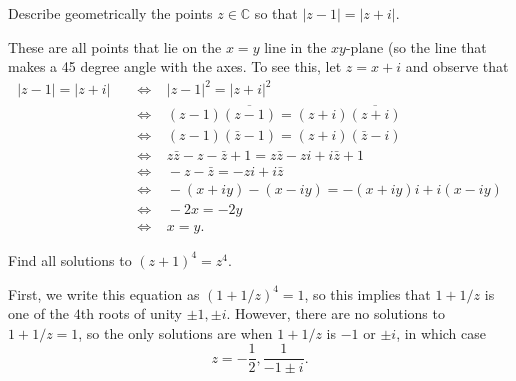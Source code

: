 \documentclass[11pt,dvipsnames]{book}
\numberwithin{figure}{section} %
\numberwithin{table}{section} %
\begin{document}
\begin{exercise} Describe geometrically the points $z\in\mathbb{C}$ so that $|z-1|=|z+i|$.

\begin{solution}
These are all points that lie on the $x=y$ line in the $xy$-plane (so the line that makes a 45 degree angle with the axes. To see this, let $z=x+i$ and observe that
\begin{align*}
|z-1|=|z+i| & \;\;\; \Longleftrightarrow \;\;\; |z-1|^2=|z+i|^2\\
& \;\;\; \Longleftrightarrow \;\;\; (z-1)\overline{(z-1)} = (z+i)\overline{(z+i)} \\
& \;\;\; \Longleftrightarrow \;\;\;  (z-1)(\bar{z}-1)=(z+i)(\bar{z}-i) \\
& \;\;\; \Longleftrightarrow \;\;\; z\bar{z}-z-\bar{z}+1 = z\bar{z} -zi+i\bar{z}+1\\
& \;\;\; \Longleftrightarrow \;\;\;  -z-\bar{z}= -zi+i\bar{z}\\
& \;\;\; \Longleftrightarrow \;\;\;  -(x+iy)-(x-iy) = -(x+iy)i+i(x-iy) \\
& \;\;\; \Longleftrightarrow \;\;\;  -2x = -2y\\
& \;\;\; \Longleftrightarrow \;\;\;  x=y.
\end{align*}
\end{solution}
\end{exercise}

\begin{exercise} Find all solutions to $(z+1)^4=z^4$.

\begin{solution}
First, we write this equation as $(1+1/z)^4=1$, so this implies that $1+1/z$ is one of the $4$th roots of unity $\pm1,\pm i$. However, there are no solutions to $1+1/z=1$, so the only solutions are when $1+1/z$ is $-1$ or $\pm i$, in which case
\[
z=-\frac{1}{2}, \frac{1}{-1\pm i}.
\]
\end{solution}

\end{exercise}
\end{document}
